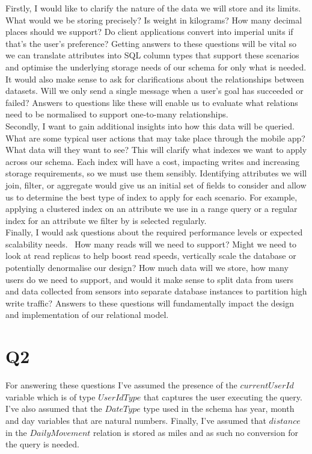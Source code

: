 \documentclass{article}
\begin{document}
Firstly, I would like to clarify the nature of the data we will store and its limits. What would we be storing precisely? Is weight in kilograms? How many decimal places should we support? Do client applications convert into imperial units if that’s the user’s preference? Getting answers to these questions will be vital so we can translate attributes into SQL column types that support these scenarios and optimise the underlying storage needs of our schema for only what is needed. It would also make sense to ask for clarifications about the relationships between datasets. Will we only send a single message when a user’s goal has succeeded or failed? Answers to questions like these will enable us to evaluate what relations need to be normalised to support one-to-many relationships. \\
\newline
Secondly, I want to gain additional insights into how this data will be queried. What are some typical user actions that may take place through the mobile app? What data will they want to see? This will clarify what indexes we want to apply across our schema. Each index will have a cost, impacting writes and increasing storage requirements, so we must use them sensibly. Identifying attributes we will join, filter, or aggregate would give us an initial set of fields to consider and allow us to determine the best type of index to apply for each scenario. For example, applying a clustered index on an attribute we use in a range query or a regular index for an attribute we filter by is selected regularly. \\
\newline
Finally, I would ask questions about the required performance levels or expected scalability needs.  How many reads will we need to support? Might we need to look at read replicas to help boost read speeds, vertically scale the database or potentially denormalise our design? How much data will we store, how many users do we need to support, and would it make sense to split data from users and data collected from sensors into separate database instances to partition high write traffic? Answers to these questions will fundamentally impact the design and implementation of our relational model. \\
\pagebreak

\section*{Q2}

For answering these questions I've assumed the presence of the $currentUserId$ variable which is of type $UserIdType$ that captures the user executing the query. I've also assumed that the $DateType$ type used in the schema has year, month and day variables that are natural numbers. Finally, I've assumed that $distance$ in the $DailyMovement$ relation is stored as miles and as such no conversion for the query is needed.
\end{document}
